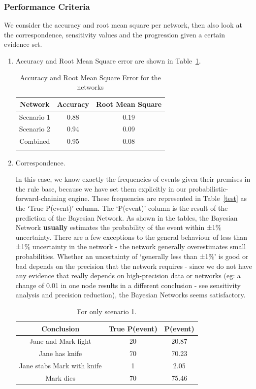 \subsubsection{Performance Criteria}
We consider the accuracy and root mean square per network, then also look at the correspondence, sensitivity values and the progression given a certain evidence set.

\begin{enumerate}
\item Accuracy and Root Mean Square error are shown in Table~\ref{tabAcc}. 

\begin{table}[h]
\begin{center}
\begin{tabular}{|c|c|c|}
 \hline
 Network & Accuracy & Root Mean Square\\
 \hline
 Scenario 1   & 0.88 &  0.19   \\
 Scenario 2 & 0.94 & 0.09 \\
 Combined & 0.95 & 0.08 \\
\hline
\label{tabAcc}
\end{tabular}
\caption{Accuracy and Root Mean Square Error for the networks}
\end{center}
\end{table}

\item Correspondence.

In this case, we know exactly the frequencies of events given their premises in the rule base, because we have set them explicitly in our probabilistic-forward-chaining engine. These frequencies are represented in Table~\ref{test} as the `True P(event)' column. The `P(event)' column is the result of the prediction of the Bayesian Network. As shown in the tables, the Bayesian Network \textbf{usually} estimates the probability of the event within ±1\% uncertainty. There are a few exceptions to the general behaviour of less than ±1\% uncertainty in the network - the network generally overestimates small probabilities. Whether an uncertainty of `generally less than ±1\%' is good or bad depends on the precision that the network requires - since we do not have any evidence that really depends on high-precision data or networks (eg: a change of 0.01 in one node results in a different conclusion - see sensitivity analysis and precision reduction), the Bayesian Networks seems satisfactory. 


\begin{table}
\begin{center}
\begin{tabular}{|c|c|c|}
 \hline
 Conclusion & True P(event) & P(event) \\
 \hline
 Jane and Mark fight   & 20 &  20.87   \\
 Jane has knife & 70 & 70.23 \\
 Jane stabs Mark with knife & 1 & 2.05 \\
 Mark dies & 70 & 75.46 \\ 
\hline
\end{tabular}
\caption{For only scenario 1.}


\end{center}
\end{table}
\end{enumerate}
